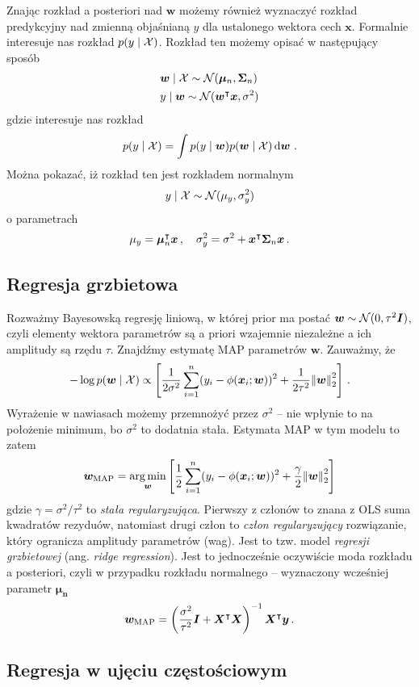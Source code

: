 \documentclass{myclass}
\begin{document}
Znając rozkład a posteriori nad \(\bm{w}\) możemy również wyznaczyć rozkład predykcyjny nad zmienną
objaśnianą \(y\) dla ustalonego wektora cech \(\bm{x}\). Formalnie interesuje nas rozkład \(p(y \mid
\mathcal{X})\). Rozkład ten możemy opisać w następujący sposób
\[
\begin{split}
    &\bm{w} \mid \mathcal{X} \sim \mathcal{N}(\bm{\mu}_n, \bm{\Sigma}_n)\\
    &y \mid \bm{w} \sim \mathcal{N}(\bm{w}^\intercal \bm{x}, \sigma^2)
\end{split}
\]
gdzie interesuje nas rozkład
\[
    p(y \mid \mathcal{X}) = \int p(y \mid \bm{w}) p(\bm{w} \mid \mathcal{X}) \dd{\bm{w}}\,.
\]
Można pokazać, iż rozkład ten jest rozkładem normalnym
\[
    y \mid \mathcal{X} \sim \mathcal{N}(\mu_y, \sigma_y^2)
\]
o parametrach
\[
    \mu_y = \bm{\mu}_n^\intercal \bm{x}\,,\quad \sigma^2_y = \sigma^2 + \bm{x}^\intercal \bm{\Sigma}_n \bm{x}\,.
\]


\subsection{Regresja grzbietowa}

Rozważmy Bayesowską regresję liniową, w której prior ma postać \(\bm{w} \sim \mathcal{N}(0,
\tau^2\bm{I})\), czyli elementy wektora parametrów są a priori wzajemnie niezależne a ich amplitudy
są rzędu \(\tau\). Znajdźmy estymatę MAP parametrów \(\bm{w}\). Zauważmy, że 
\[
-\log p(\bm{w} \mid \mathcal{X}) \propto \left[ \frac{1}{2\sigma^2}\sum_{i=1}^n (y_i - \phi(\bm{x}_i; \bm{w}))^2 + \frac{1}{2\tau^2}\norm{\bm{w}}_2^2 \right]\,. 
\]
Wyrażenie w nawiasach możemy przemnożyć przez \(\sigma^2\) -- nie wpłynie to na położenie minimum,
bo \(\sigma^2\) to dodatnia stała. Estymata MAP w tym modelu to zatem
\[
    \bm{w}_\text{MAP} = \operatorname*{arg\,min}_{\bm{w}} \left[ \frac{1}{2}\sum_{i=1}^n (y_i - \phi(\bm{x}_i; \bm{w}))^2 + \frac{\gamma}{2}\norm{\bm{w}}_2^2 \right]
\]
gdzie \(\gamma = \sigma^2 / \tau^2\) to \emph{stała regularyzująca}. Pierwszy z członów to znana z
OLS suma kwadratów rezyduów, natomiast drugi człon to \emph{człon regularyzujący} rozwiązanie, który
ogranicza amplitudy parametrów (wag). Jest to tzw. model \emph{regresji grzbietowej} (ang.
\emph{ridge regression}). Jest to jednocześnie oczywiście moda rozkładu a posteriori, czyli w
przypadku rozkładu normalnego -- wyznaczony wcześniej parametr \(\bm{\mu_n}\)
\[
    \bm{w}_\text{MAP} = \left(\frac{\sigma^2}{\tau^2}\bm{I} + \bm{X}^\intercal\bm{X}\right)^{-1}\bm{X}^\intercal\bm{y}\,.
\]


\subsection{Regresja w ujęciu częstościowym}
\end{document}
